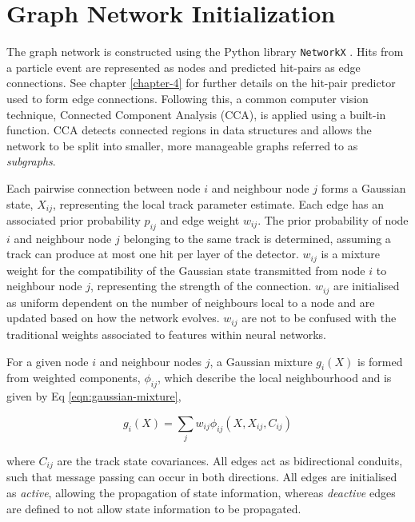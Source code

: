 \section{Graph Network Initialization}
\label{gnn-network-initialization}

The graph network is constructed using the Python library \texttt{NetworkX} \cite{SciPyProceedings_11}. Hits from a particle event are represented as nodes and predicted hit-pairs as edge connections. See chapter \ref{chapter-4} for further details on the hit-pair predictor used to form edge connections. Following this, a common computer vision technique, Connected Component Analysis (CCA), is applied using a built-in function\cite{networkx}. CCA detects connected regions in data structures and allows the network to be split into smaller, more manageable graphs referred to as \textit{subgraphs}. 

Each pairwise connection between node $i$ and neighbour node $j$ forms a Gaussian state, $X_{ij}$, representing the local track parameter estimate. Each edge has an associated prior probability $p_{ij}$ and edge weight $w_{ij}$. The prior probability of node $i$ and neighbour node $j$ belonging to the same track is determined, assuming a track can produce at most one hit per layer of the detector. $w_{ij}$ is a mixture weight for the compatibility of the Gaussian state transmitted from node $i$ to neighbour node $j$, representing the strength of the connection. $w_{ij}$ are initialised as uniform dependent on the number of neighbours local to a node and are updated based on how the network evolves. $w_{ij}$ are not to be confused with the traditional weights associated to features within neural networks.

For a given node $i$ and neighbour nodes $j$, a Gaussian mixture $g_i(X)$ is formed from weighted components, $\phi_{ij}$, which describe the local neighbourhood and is given by Eq \eqref{eqn:gaussian-mixture},

\begin{equation}
g_i(X) = \sum_{j} w_{ij}\phi_{ij}(X, X_{ij}, C_{ij})
\label{eqn:gaussian-mixture}
\end{equation}

where $C_{ij}$ are the track state covariances. All edges act as bidirectional conduits, such that message passing can occur in both directions. All edges are initialised as \textit{active}, allowing the propagation of state information, whereas \textit{deactive} edges are defined to not allow state information to be propagated. 

